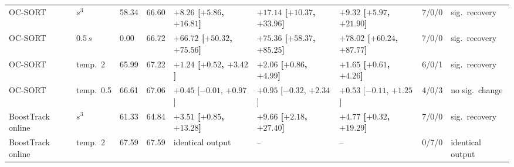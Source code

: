 \begin{table}[t]
{\begin{tabular}{lllllllll}
OC-SORT & $s^3$ & 58.34 & 66.60 & {\bfseries\boldmath $+8.26$ [$+5.86$, $+16.81$]} & {\bfseries\boldmath $+17.14$ [$+10.37$, $+33.96$]} & {\bfseries\boldmath $+9.32$ [$+5.97$, $+21.90$]} & 7/0/0 & sig.\ recovery \\
OC-SORT & $0.5\,s$ & 0.00 & 66.72 & {\bfseries\boldmath $+66.72$ [$+50.32$, $+75.56$]} & {\bfseries\boldmath $+75.36$ [$+58.37$, $+85.25$]} & {\bfseries\boldmath $+78.02$ [$+60.24$, $+87.77$]} & 7/0/0 & sig.\ recovery \\
OC-SORT & temp.\ 2 & 65.99 & 67.22 & {\bfseries\boldmath $+1.24$ [$+0.52$, $+3.42$]} & {\bfseries\boldmath $+2.06$ [$+0.86$, $+4.99$]} & {\bfseries\boldmath $+1.65$ [$+0.61$, $+4.26$]} & 6/0/1 & sig.\ recovery \\
OC-SORT & temp.\ 0.5 & 66.61 & 67.06 & $+0.45$ [$-0.01$, $+0.97$] & $+0.95$ [$-0.32$, $+2.34$] & $+0.53$ [$-0.11$, $+1.25$] & 4/0/3 & no sig.\ change \\
BoostTrack online & $s^3$ & 61.33 & 64.84 & {\bfseries\boldmath $+3.51$ [$+0.85$, $+13.28$]} & {\bfseries\boldmath $+9.66$ [$+2.18$, $+27.40$]} & {\bfseries\boldmath $+4.77$ [$+0.32$, $+19.29$]} & 7/0/0 & sig.\ recovery \\
BoostTrack online & temp.\ 2 & 67.59 & 67.59 & identical output & -- & -- & 0/7/0 & identical output \\
\hline
\end{tabular}}
\end{table}
